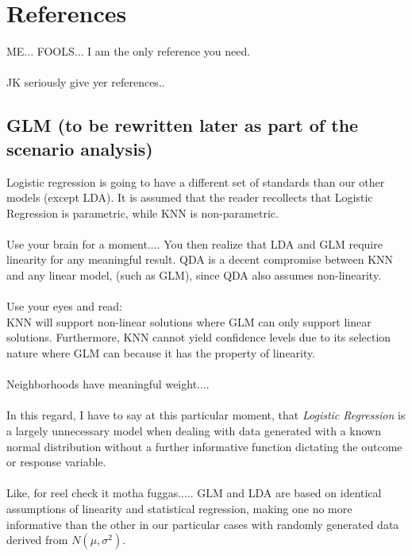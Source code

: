 \documentclass[11pt, oneside]{article}
\begin{document}
\section*{References}
ME... FOOLS... I am the only reference you need.\\
\\
JK seriously give yer references..

\subsection*{GLM (to be rewritten later as part of the scenario analysis)}
Logistic regression is going to have a different set of standards than our other models (except LDA). It is assumed that the reader recollects that Logistic Regression is parametric, while KNN is non-parametric.\\
\\
Use your brain for a moment.... You then realize that LDA and GLM require linearity for any meaningful result. QDA is a decent compromise between KNN and any linear model, (such as GLM), since QDA also assumes non-linearity.\\
\\
Use your eyes and read:\\
KNN will support non-linear solutions where GLM can only support linear solutions. Furthermore, KNN cannot yield confidence levels due to its selection nature where GLM can because it has the property of linearity.\\
\\
Neighborhoods have meaningful weight....\\
\\
In this regard, I have to say at this particular moment, that \emph{Logistic Regression} is a largely unnecessary model when dealing with data generated with a known normal distribution without a further informative function dictating the outcome or response variable.\\
\\
Like, for reel check it motha fuggas..... GLM and LDA are based on identical assumptions of linearity and statistical regression, making one no more informative than the other in our particular cases with randomly generated data derived from $N(\mu, \sigma^2)$.\\
\\
\\
\end{document}
